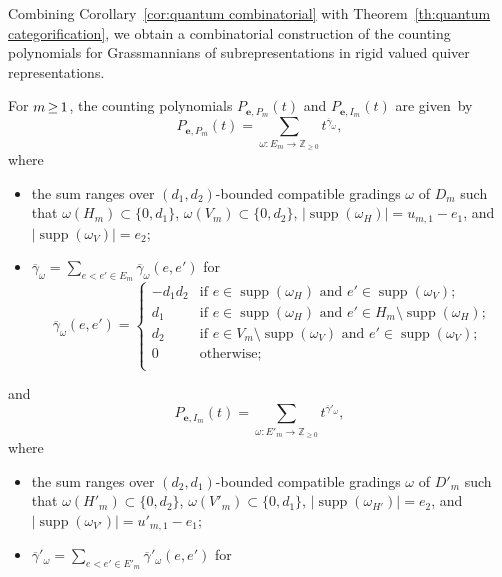 \documentclass[ALCO,ThmDefs,Unicode,epreuves]{cedram}
\newcommand{\bfe}{\mathbf{e}}
\newcommand{\ZZ}{\mathbb{Z}}
\DeclareMathOperator{\supp}{supp}
\newcommand*{\Mk}{\mkern -2mu}
\begin{document}
Combining Corollary~\ref{cor:quantum combinatorial} with Theorem~\ref{th:quantum categorification}, we obtain a combinatorial construction of the counting polynomials for Grassmannians of subrepresentations in rigid valued quiver representations.
\begin{corollary}
 \label{cor:combinatorial polynomials}
 For $m\Mk \ge \Mk 1$, the counting polynomials $P_{\bfe,P_m}(t)$ and $P_{\bfe,I_m}(t)$ are given~by
 \begin{equation}
 \label{eq:preprojective counting polynomial}
 P_{\bfe,P_m}(t)=\sum\limits_{\omega:E_m\to\ZZ_{\ge0}} t^{\overline{\gamma}_\omega},
 \end{equation}
 where 
 \begin{itemize}
 \item the sum ranges over $(d_1,d_2)$-bounded compatible gradings $\omega$ of $D_m$ such that $\omega(H_m)\subset\{0,d_1\}$, $\omega(V_m)\subset\{0,d_2\}$, $|\supp(\omega_H)|=u_{m,1}-e_1$, and $|\supp(\omega_V)|=e_2$;
 \item $\overline{\gamma}_\omega=\sum\limits_{e<e'\in E_m}\overline{\gamma}_\omega(e,e')$ for
 \begin{equation}
 \label{eq:polynomial exponents}
 \overline{\gamma}_\omega(e,e')=\begin{cases}
 -d_1d_2 & \text{if $e\in\supp(\omega_H)$ and $e'\in\supp(\omega_V)$;}\\ 
 d_1 & \text{if $e\in\supp(\omega_H)$ and $e'\in H_m\setminus\supp(\omega_H)$;}\\ 
 d_2 & \text{if $e\in V_m\setminus\supp(\omega_V)$ and $e'\in\supp(\omega_V)$;}\\ 
 0 & \text{otherwise;}\\ 
 \end{cases}
 \end{equation} 
 \end{itemize}
 and
 \begin{equation}
 \label{eq:preinjective counting polynomial}
 P_{\bfe,I_m}(t)=\sum\limits_{\omega:E'_m\to\ZZ_{\ge0}} t^{\overline{\gamma}'_\omega},
 \end{equation}
 where
 \begin{itemize}
 \item the sum ranges over $(d_2,d_1)$-bounded compatible gradings $\omega$ of $D'_m$ such that $\omega(H'_m)\subset\{0,d_2\}$, $\omega(V'_m)\subset\{0,d_1\}$, $|\supp(\omega_{H'})|=e_2$, and $|\supp(\omega_{V'})|=u'_{m,1}-e_1$;
 \item $\overline{\gamma}'_\omega=\sum\limits_{e<e'\in E'_m}\overline{\gamma}'_\omega(e,e')$ for

\end{itemize}
\end{corollary}
\end{document}
